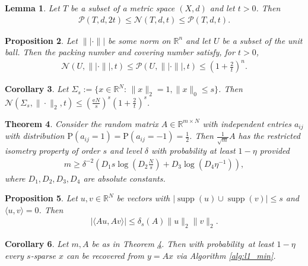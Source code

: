 \documentclass[13pt]{article}
\newtheorem{thm}{Theorem}[section]
\newtheorem{lem}[thm]{Lemma}
\newtheorem{prop}[thm]{Proposition}
\newtheorem{cor}[thm]{Corollary}
\theoremstyle{plain}
\newcommand{\R}{\mathbb{R}}
\newcommand{\e}{\mathrm{e}}
\renewcommand{\P}{\bm{\mathrm{P}}}
\newcommand{\NN}{\mathcal{N}}
\newcommand{\PP}{\mathcal{P}}
\newcommand{\set}[1]{{\{#1\}}}
\DeclareMathOperator{\supp}{supp}
\begin{document}
\begin{lem}
    Let $T$ be a subset of a metric space $(X,d)$ and let $t > 0$. Then
    \[
        \begin{aligned}
            \PP(T,d,2t) \le \NN(T,d,t) \le \PP(T,d,t).
        \end{aligned}
    \]
\end{lem} 

\begin{prop}
    Let $\| |\cdot\| |$ be some norm on $\R^n$ and let $U$ be a subset of the unit ball.
    Then the packing number and covering number satisfy, for $t > 0$,
    \[
        \begin{aligned}
            \NN(U, \| |\cdot\| |,t) \le \PP(U, \| |\cdot\| |,t) \le (1+\frac{2}{t})^n.
        \end{aligned}
    \]
\end{prop}

\begin{cor}
    Let $\Sigma_s := \set{x \in \R^N :\, \|x\|_2 = 1, \|x\|_0 \le s}$.
    Then $\NN(\Sigma_s,\|\cdot\|_2,t) \le \left( \frac{\e N}{s} \right)^s \left( 1 +\frac{2}{t} \right)^s$.
\end{cor} 

\begin{thm} \label{thm:binrip}
    Consider the random matrix $A \in \R^{m \times N}$ with independent entries
    $a_{ij}$ with distribution $\P(a_{ij} = 1) = \P(a_{ij} = -1) = \frac{1}{2}$.
    Then $\frac{1}{\sqrt{m}}A$ has the restricted isometry property of order $s$ and level
    $\delta$ with probability at least $1 - \eta$ provided
    \[
        \begin{aligned}
            m \ge \delta^{-2} \left( D_1s\log\left( D_2 \frac{N}{s} \right) + D_3\log(D_4\eta^{-1}) \right),
        \end{aligned}
    \]
    where $D_1,D_2,D_3,D_4$ are absolute constants.
\end{thm}

\begin{prop}
    Let $u,v \in \R^N$ be vectors with $|\supp(u) \cup \supp(v)| \le s$ and $\langle u,v \rangle = 0$.
    Then
    \[
        \begin{aligned}
            |\langle Au, Av \rangle| \le \delta_s(A) \|u\|_2\|v\|_2.
        \end{aligned}
    \]
\end{prop}

\begin{cor}
    Let $m, A$ be as in Theorem \ref{thm:binrip}. Then with probability at least
    $1 - \eta$ every $s$-sparse $x$ can be recovered from $y = Ax$ via Algorithm \ref{alg:l1_min}.
\end{cor}
\end{document}
